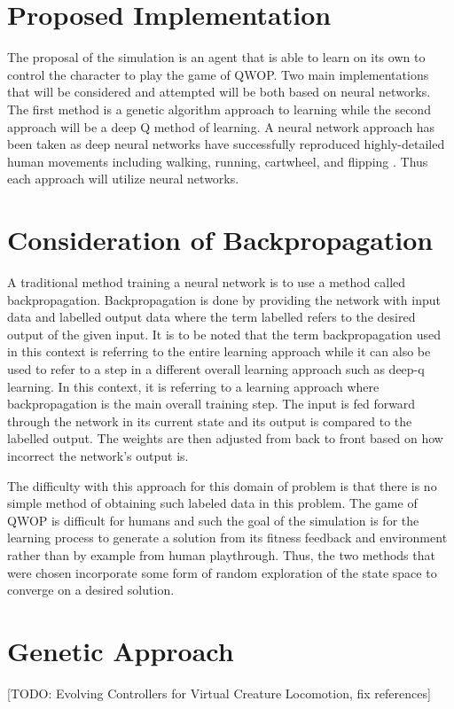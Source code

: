 \documentclass[letterpaper]{article} %
\begin{document}
\section{Proposed Implementation}

The proposal of the simulation is an agent that is able to learn on its own to control the character to play the game of QWOP. Two main implementations that will be considered and attempted will be both based on neural networks. The first method is a genetic algorithm approach to learning while the second approach will be a deep Q method of learning. A neural network approach has been taken as deep neural networks have successfully reproduced highly-detailed human movements including walking, running, cartwheel, and flipping \cite{2018-TOG-deepMimic}. Thus each approach will utilize neural networks.

\section{Consideration of Backpropagation}

A traditional method training a neural network is to use a method called backpropagation. Backpropagation is done by providing the network with input data and labelled output data where the term labelled refers to the desired output of the given input. It is to be noted that the term backpropagation used in this context is referring to the entire learning approach while it can also be used to refer to a step in a different overall learning approach such as deep-q learning. In this context, it is referring to a learning approach where backpropagation is the main overall training step. The input is fed forward through the network in its current state and its output is compared to the labelled output. The weights are then adjusted from back to front based on how incorrect the network's output is. 

\par The difficulty with this approach for this domain of problem is that there is no simple method of obtaining such labeled data in this problem. The game of QWOP is difficult for humans and such the goal of the simulation is for the learning process to generate a solution from its fitness feedback and environment rather than by example from human playthrough. Thus, the two methods that were chosen incorporate some form of random exploration of the state space to converge on a desired solution.

\section{Genetic Approach}
[TODO: Evolving Controllers for Virtual Creature Locomotion, fix references] 
\end{document}
